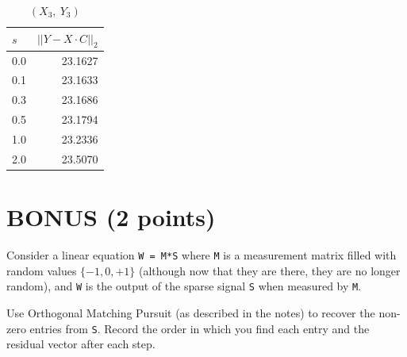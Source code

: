 \documentclass[11pt]{article}
\begin{document}
\begin{table}[H]
\centering
\caption{$(X_{3},\ Y_{3})$}
\begin{tabular}{@{}l r@{}}
\hline\hline
$s$ & $\left|\left| Y - X\cdot C\right|\right|_{2}$\\
\hline
0.0 & 23.1627 \\
0.1 & 23.1633 \\
0.3 & 23.1686 \\
0.5 & 23.1794 \\
1.0 & 23.2336 \\
2.0 & 23.5070 \\
\hline
\end{tabular}
\end{table}

\section{BONUS (2 points)}

Consider a linear equation \texttt{W = M*S} where \texttt{M} is a measurement matrix filled with random values $\{-1, 0, +1\}$ (although now that they are there, they are no longer random), and \texttt{W} is the output of the sparse signal \texttt{S} when measured by \texttt{M}.  

Use Orthogonal Matching Pursuit (as described in the notes) to recover the non-zero entries from \texttt{S}.  Record the order in which you find each entry and the residual vector after each step.  
\end{document}
